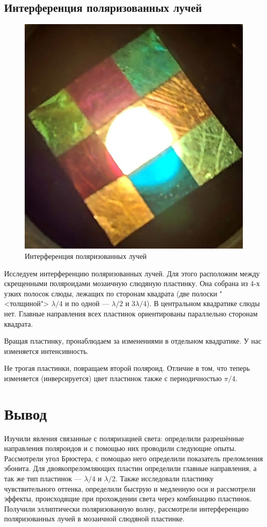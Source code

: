 \documentclass[a4paper,12pt]{article}
\begin{document}
\subsection{Интерференция поляризованных лучей}
\begin{figure}
	\includegraphics[width=\linewidth]{9}
	\caption{Интерференция поляризованных лучей}
	\label{ris 9}
\end{figure}
Исследуем интерференцию поляризованных лучей. Для этого расположим между скрещенными поляроидами мозаичную слюдяную пластинку. Она собрана из 4-х узких полосок слюды, лежащих по сторонам квадрата (две полоски "<толщиной"> $ \lambda/4 $ и по одной --- $ \lambda/2 $ и $ 3\lambda/4 $). В центральном квадратике слюды нет. Главные направления всех пластинок ориентированы параллельно сторонам квадрата.

Вращая пластинку, пронаблюдаем за изменениями в отдельном квадратике. У нас изменяется интенсивность. 

Не трогая пластинки, повращаем второй поляроид. Отличие в том, что теперь изменяется (инверсируется) цвет пластинок также с периодичностью  $\pi/4$.

\section{Вывод}
Изучили явления связанные с поляризацией света: определили разрешённые направления поляроидов и с помощью них проводили следующие опыты. Рассмотрели угол Брюстера, с помощью него определили показатель преломления эбонита. Для двоякопреломляющих пластин определили главные направления, а так же тип пластинок --- $\lambda /4$ и $\lambda/2$. Также исследовали пластинку чувствительного оттенка, определили быструю и медленную оси и рассмотрели эффекты, происходящие при прохождении света через комбинацию пластинок. Получили эллиптически поляризованную волну, рассмотрели интерференцию поляризованных лучей в мозаичной слюдяной пластинке.
\end{document}
